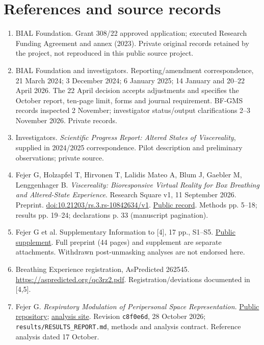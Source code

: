 \newpage
\section*{References and source records}
\label{sec:references}
\small
\begin{enumerate}
\setlength{\itemsep}{4pt}
\item BIAL Foundation. Grant 308/22 approved application; executed Research Funding Agreement and annex (2023). Private original records retained by the project, not reproduced in this public source project.
\item BIAL Foundation and investigators. Reporting/amendment correspondence, 21 March 2024; 3 December 2024; 6 January 2025; 14 January and 20--22 April 2026. The 22 April decision accepts adjustments and specifies the October report, ten-page limit, forms and journal requirement. BF-GMS records inspected 2 November; investigator status/output clarifications 2--3 November 2026. Private records.
\item Investigators. \emph{Scientific Progress Report: Altered States of Viscereality}, supplied in 2024/2025 correspondence. Pilot description and preliminary observations; private source.
\item Fejer G, Holzapfel T, Hirvonen T, Lalidis Mateo A, Blum J, Gaebler M, Lenggenhager B. \emph{Viscereality: Bioresponsive Virtual Reality for Box Breathing and Altered-State Experience}. Research Square v1, 11 September 2026. Preprint. \href{https://doi.org/10.21203/rs.3.rs-10842634/v1}{doi:10.21203/rs.3.rs-10842634/v1}. \href{https://www.researchsquare.com/article/rs-10842634/v1}{Public record}. Methods pp. 5--18; results pp. 19--24; declarations p. 33 (manuscript pagination).
\item Fejer G et al. Supplementary Information to [4], 17 pp., S1--S5. \href{https://assets-eu.researchsquare.com/files/rs-10842634/v1/dcb7b36aa988f069fc463e3a.pdf}{Public supplement}. Full preprint (44 pages) and supplement are separate attachments. Withdrawn post-unmasking analyses are not endorsed here.
\item Breathing Experience registration, AsPredicted 262545. \url{https://aspredicted.org/qc3rz2.pdf}. Registration/deviations documented in [4,5].
\item Fejer G. \emph{Respiratory Modulation of Peripersonal Space Representation}. \href{https://github.com/GeorgeFejer91/Respiratory-Modulation-of-Peripersonal-Space-Representation}{Public repository}; \href{https://georgefejer91.github.io/Respiratory-Modulation-of-Peripersonal-Space-Representation/}{analysis site}. Revision \texttt{c8f0e6d}, 28 October 2026; \texttt{results/RESULTS\_REPORT.md}, methods and analysis contract. Reference analysis dated 17 October.

\end{enumerate}
